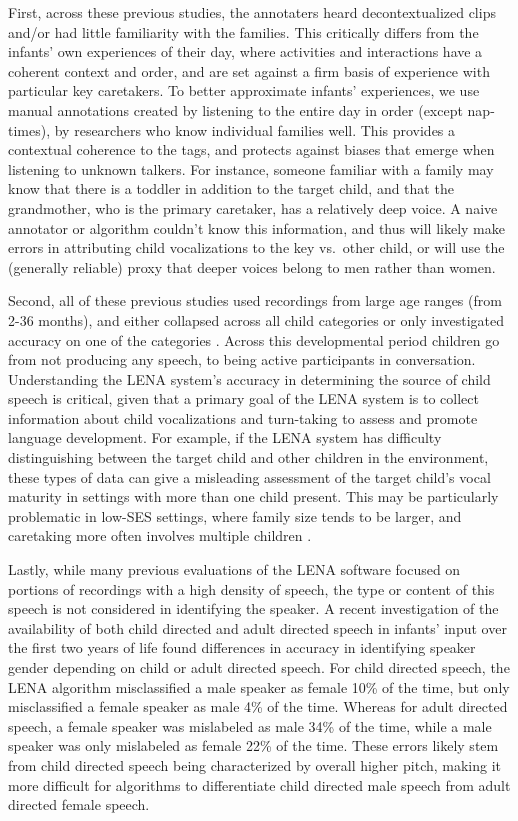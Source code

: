 \documentclass[man,floatsintext]{apa6}
\theoremstyle{definition}
\theoremstyle{definition}
\theoremstyle{definition}
\theoremstyle{remark}
\begin{document}
First, across these previous studies, the annotaters heard
decontextualized clips and/or had little familiarity with the families.
This critically differs from the infants' own experiences of their day,
where activities and interactions have a coherent context and order, and
are set against a firm basis of experience with particular key
caretakers. To better approximate infants' experiences, we use manual
annotations created by listening to the entire day in order (except
nap-times), by researchers who know individual families well. This
provides a contextual coherence to the tags, and protects against biases
that emerge when listening to unknown talkers. For instance, someone
familiar with a family may know that there is a toddler in addition to
the target child, and that the grandmother, who is the primary
caretaker, has a relatively deep voice. A naive annotator or algorithm
couldn't know this information, and thus will likely make errors in
attributing child vocalizations to the key vs.~other child, or will use
the (generally reliable) proxy that deeper voices belong to men rather
than women.

Second, all of these previous studies used recordings from large age
ranges (from 2-36 months), and either collapsed across all child
categories \citep[target vs.~other child,][]{Xu2009} or only
investigated accuracy on one of the categories \citep[target
child,][]{Vandam2016}. Across this developmental period children go from
not producing any speech, to being active participants in conversation.
Understanding the LENA system's accuracy in determining the source of
child speech is critical, given that a primary goal of the LENA system
is to collect information about child vocalizations and turn-taking to
assess and promote language development. For example, if the LENA system
has difficulty distinguishing between the target child and other
children in the environment, these types of data can give a misleading
assessment of the target child's vocal maturity in settings with more
than one child present. This may be particularly problematic in low-SES
settings, where family size tends to be larger, and caretaking more
often involves multiple children \citep{Division2015}.

Lastly, while many previous evaluations of the LENA software focused on
portions of recordings with a high density of speech, the type or
content of this speech is not considered in identifying the speaker. A
recent investigation of the availability of both child directed and
adult directed speech in infants' input over the first two years of life
\citep{BergelsonCasillas} found differences in accuracy in identifying
speaker gender depending on child or adult directed speech. For child
directed speech, the LENA algorithm misclassified a male speaker as
female 10\% of the time, but only misclassified a female speaker as male
4\% of the time. Whereas for adult directed speech, a female speaker was
mislabeled as male 34\% of the time, while a male speaker was only
mislabeled as female 22\% of the time. These errors likely stem from
child directed speech being characterized by overall higher pitch,
making it more difficult for algorithms to differentiate child directed
male speech from adult directed female speech.
\end{document}
